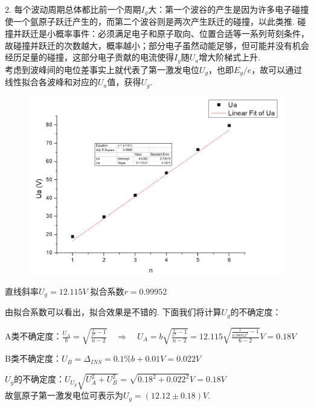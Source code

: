 \documentclass[UTF8]{ctexart}
\begin{document}
2. 每个波动周期总体都比前一个周期$I_g$大：第一个波谷的产生是因为许多电子碰撞使一个氩原子跃迁产生的，而第二个波谷则是两次产生跃迁的碰撞，以此类推. 碰撞并跃迁是小概率事件：必须满足电子和原子取向、位置合适等一系列苛刻条件，故碰撞并跃迁的次数越大，概率越小；部分电子虽然动能足够，但可能并没有机会经历足量的碰撞，这部分电子贡献的电流使得$I_g$随$U_a$增大阶梯式上升.\\
考虑到波峰间的电位差事实上就代表了第一激发电位$U_g$，也即$E_g/e$，故可以通过线性拟合各波峰和对应的$U_a$值，获得$U_g$.
\vspace{-2em}
\begin{center}
    \begin{figure}[H]
        \includegraphics[scale=0.4]{linear.PNG}\\
        \vspace{-2.5em}
    \end{figure}
    \vspace{-1.5em}直线斜率$U_g=12.115V$ \quad
拟合系数$r=0.99952$
\end{center}
\begin{center}\end{center}
\vspace{-3em}
由拟合系数可以看出，拟合效果是不错的. 下面我们将计算$U_g$的不确定度：\par
A类不确定度：$\displaystyle{\frac{U_A}{b}=\sqrt{\frac{\frac{1}{r^2}-1}{n-2}}\quad \Longrightarrow\quad U_A=b\sqrt{\frac{\frac{1}{r^2}-1}{n-2}}=12.115\sqrt{\frac{\frac{1}{0.99952^2}-1}{6-2}}V=0.18V}$\par
B类不确定度：$\displaystyle{U_B=\Delta_{INS}=0.1\%b+0.01V=0.022V}$\par
$U_g$的不确定度：$\displaystyle{U_{U_g}\sqrt{U_A^2+U_B^2}=\sqrt{0.18^2+0.022^2}V=0.18V}$\\
故氩原子第一激发电位可表示为$U_g=(12.12\pm 0.18)V$.\par
\end{document}

